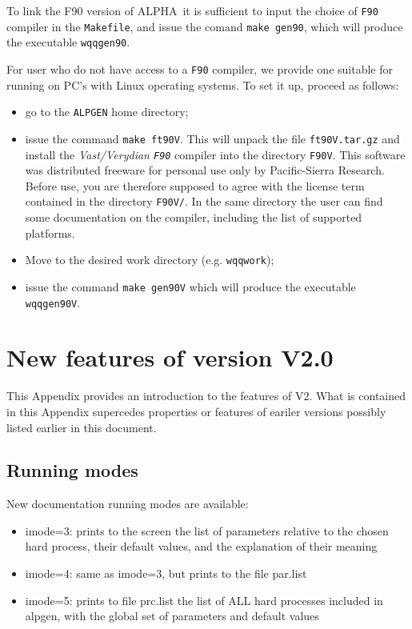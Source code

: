 \documentclass[paper]{JHEP3}
\def\ALPHA{{\small ALPHA}}
\begin{document}
\begin{appendix}
To link the F90 version of \ALPHA\ it is sufficient to input the choice
of {\tt F90} compiler in the {\tt Makefile}, and issue the comand
{\tt make gen90}, which will produce the executable {\tt wqqgen90}.

For user who do not have access to a {\tt F90} compiler, we provide
one suitable for running on PC's with Linux operating
systems. To set it up, proceed as follows: 
\begin{itemize}
\item go to the {\tt ALPGEN} home directory;
\item issue the command {\tt make ft90V}. This will unpack the file
  {\tt ft90V.tar.gz} and install the {\em Vast/Verydian {\tt F90}}
    compiler into the directory {\tt F90V}. This software was
  distributed freeware for personal use only by Pacific-Sierra
  Research. Before use, you are therefore supposed to agree with the license
  term contained in the directory {\tt F90V/}. In the same directory
  the user can find some documentation on the compiler, including the
  list of supported platforms.
\item Move to the desired work directory (e.g. {\tt wqqwork});
\item issue the command {\tt make gen90V} which will produce the executable
{\tt wqqgen90V}. 
\end{itemize}

\section{New features of version V2.0}
\label{sec:v20}
This Appendix provides an  introduction to the features
of V2. What is
contained in this Appendix supercedes properties or features of eariler
versions possibly listed earlier in this document. 
\subsection{Running modes}
New documentation running modes are available:
\begin{itemize}
\item imode=3: prints to the screen the list of parameters relative to the
  chosen hard process, their default values, and the explanation of
  their meaning
\item imode=4: same as imode=3, but prints to the file par.list
\item imode=5: prints to file prc.list the list of ALL hard processes
  included in alpgen, with the global set of parameters and default
  values
\end{itemize} 
 

\end{appendix}
\end{document}
